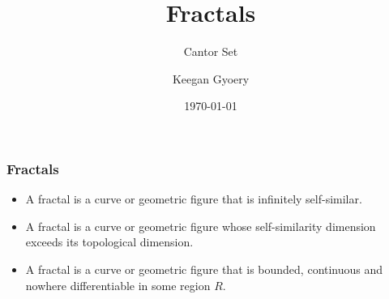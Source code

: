 \documentclass{beamer}
\title{Fractals}
\subtitle{Cantor Set}
\author{Keegan Gyoery}
\institute{UNSW}
\date{\today}
\newcommand{\ds}{\displaystyle}
\begin{document}
\begin{frame}
	\titlepage
\end{frame}

\begin{frame}
	\frametitle{Fractals}
	\begin{itemize}
		\item<2->
		\begin{definition}
			A fractal is a curve or geometric figure that is infinitely self-similar.
		\end{definition}
		\item<3->
		\begin{definition}
			A fractal is a curve or geometric figure whose self-similarity dimension exceeds its topological dimension.
		\end{definition}
		\item<4->
		\begin{definition}
			A fractal is a curve or geometric figure that is bounded, continuous and nowhere differentiable in some region $\ds{R}$.
		\end{definition}
	\end{itemize}
\end{frame}
\end{document}
